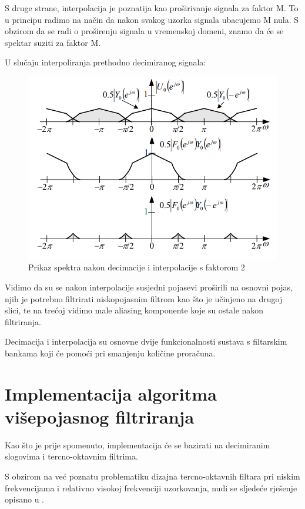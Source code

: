\documentclass[times, utf8, diplomski]{fer}
\begin{document}
 
S druge strane, interpolacija je poznatija kao proširivanje signala za faktor M. To u principu radimo na način da nakon svakog uzorka signala ubacujemo M nula. S obzirom da se radi o proširenju signala u vremenskoj domeni, znamo da će se spektar suziti za faktor M.

U slučaju interpoliranja prethodno decimiranog signala:

\begin{figure}[hbt!]
 \centering
 \includegraphics[scale=0.6]{photos/interp.png}
 \caption{Prikaz spektra nakon decimacije i interpolacije s faktorom 2}
 \label{interp}
\end{figure}

Vidimo da su se nakon interpolacije susjedni pojasevi proširili na osnovni pojas, njih je potrebno filtrirati niskopojasnim filtrom kao što je učinjeno na drugoj slici, te na trećoj vidimo male aliasing komponente koje su ostale nakon filtriranja.

Decimacija i interpolacija su osnovne dvije funkcionalnosti sustava s filtarskim bankama koji će pomoći pri smanjenju količine proračuna.


\section{Implementacija algoritma višepojasnog filtriranja}
Kao što je prije spomenuto, implementacija će se bazirati na decimiranim slogovima i tercno-oktavnim filtrima.

S obzirom na već poznatu problematiku dizajna tercno-oktavnih filtara pri niskim frekvencijama i relativno visokoj frekvenciji uzorkovanja, nudi se sljedeće rješenje opisano u \citep{fbdha}.
\end{document}
